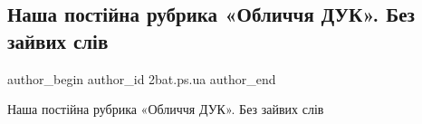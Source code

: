  
 
 
 
 
 
\subsection{Наша постійна рубрика «Обличчя ДУК». Без зайвих слів}
\label{sec:23_05_2022.fb.2bat.ps.ua.1.oblycchja_duk}
 
\ifcmt
 author_begin
   author_id 2bat.ps.ua
 author_end
\fi

Наша постійна рубрика «Обличчя ДУК». Без зайвих слів


